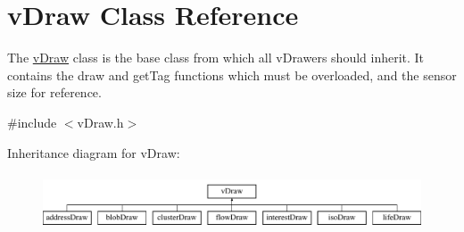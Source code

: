 \hypertarget{classvDraw}{}\section{v\+Draw Class Reference}
\label{classvDraw}


The \hyperlink{classvDraw}{v\+Draw} class is the base class from which all v\+Drawers should inherit. It contains the draw and get\+Tag functions which must be overloaded, and the sensor size for reference.  




{\ttfamily \#include $<$v\+Draw.\+h$>$}

Inheritance diagram for v\+Draw\+:\begin{figure}[H]
\begin{center}
\leavevmode
\includegraphics[height=1.684211cm]{classvDraw}
\end{center}
\end{figure}
